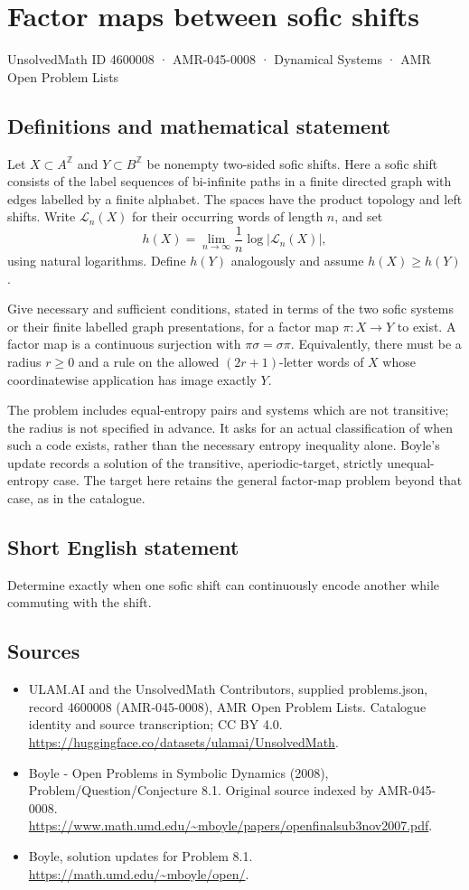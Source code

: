 \documentclass[11pt,a4paper]{article}
\begin{document}
\section*{Factor maps between sofic shifts}\label{4600008}
{\small UnsolvedMath ID 4600008 · AMR-045-0008 · Dynamical Systems · AMR Open Problem Lists}
\subsection{Definitions and mathematical statement}
Let $X\subset A^{\mathbb Z}$ and $Y\subset B^{\mathbb Z}$ be nonempty
two-sided sofic shifts. Here a sofic shift consists of the label sequences
of bi-infinite paths in a finite directed graph with edges labelled by a
finite alphabet. The spaces have the product topology and left shifts.
Write $\mathcal L_n(X)$ for their occurring words of length $n$, and set
\[
 h(X)=\lim_{n\to\infty}\frac1n\log|\mathcal L_n(X)|,
\]
using natural logarithms. Define $h(Y)$ analogously and assume $h(X)\ge h(Y)$.

Give necessary and sufficient conditions, stated in terms of the two sofic
systems or their finite labelled graph presentations, for a factor map
$\pi:X\to Y$ to exist. A factor map is a continuous surjection with
$\pi\sigma=\sigma\pi$. Equivalently, there must be a radius $r\ge0$ and
a rule on the allowed $(2r+1)$-letter words of $X$ whose coordinatewise
application has image exactly $Y$.

The problem includes equal-entropy pairs and systems which are not transitive;
the radius is not specified in advance. It asks for an actual classification
of when such a code exists, rather than the necessary entropy inequality
alone. Boyle's update records a solution of the transitive, aperiodic-target,
strictly unequal-entropy case. The target here retains the general factor-map
problem beyond that case, as in the catalogue.
\subsection{Short English statement}
Determine exactly when one sofic shift can continuously encode another while commuting with the shift.
\subsection{Sources}
\begin{itemize}
\item[S1] ULAM.AI and the UnsolvedMath Contributors, supplied problems.json, record 4600008 (AMR-045-0008), AMR Open Problem Lists. Catalogue identity and source transcription; CC BY 4.0.
\url{https://huggingface.co/datasets/ulamai/UnsolvedMath}.
\item[S2] Boyle - Open Problems in Symbolic Dynamics (2008), Problem/Question/Conjecture 8.1. Original source indexed by AMR-045-0008.
\url{https://www.math.umd.edu/~mboyle/papers/openfinalsub3nov2007.pdf}.
\item[S3] Boyle, solution updates for Problem 8.1.
\url{https://math.umd.edu/~mboyle/open/}.
\end{itemize}
\end{document}
